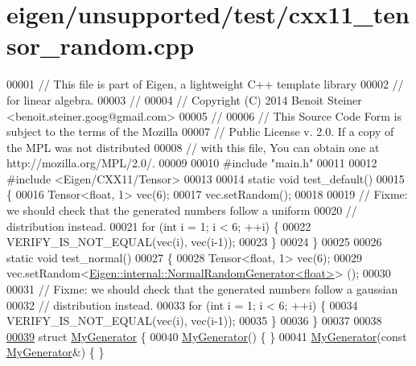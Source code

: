 \hypertarget{eigen_2unsupported_2test_2cxx11__tensor__random_8cpp_source}{}\section{eigen/unsupported/test/cxx11\+\_\+tensor\+\_\+random.cpp}
\label{eigen_2unsupported_2test_2cxx11__tensor__random_8cpp_source}

\begin{DoxyCode}
00001 \textcolor{comment}{// This file is part of Eigen, a lightweight C++ template library}
00002 \textcolor{comment}{// for linear algebra.}
00003 \textcolor{comment}{//}
00004 \textcolor{comment}{// Copyright (C) 2014 Benoit Steiner <benoit.steiner.goog@gmail.com>}
00005 \textcolor{comment}{//}
00006 \textcolor{comment}{// This Source Code Form is subject to the terms of the Mozilla}
00007 \textcolor{comment}{// Public License v. 2.0. If a copy of the MPL was not distributed}
00008 \textcolor{comment}{// with this file, You can obtain one at http://mozilla.org/MPL/2.0/.}
00009 
00010 \textcolor{preprocessor}{#include "main.h"}
00011 
00012 \textcolor{preprocessor}{#include <Eigen/CXX11/Tensor>}
00013 
00014 \textcolor{keyword}{static} \textcolor{keywordtype}{void} test\_default()
00015 \{
00016   Tensor<float, 1> vec(6);
00017   vec.setRandom();
00018 
00019   \textcolor{comment}{// Fixme: we should check that the generated numbers follow a uniform}
00020   \textcolor{comment}{// distribution instead.}
00021   \textcolor{keywordflow}{for} (\textcolor{keywordtype}{int} i = 1; i < 6; ++i) \{
00022     VERIFY\_IS\_NOT\_EQUAL(vec(i), vec(i-1));
00023   \}
00024 \}
00025 
00026 \textcolor{keyword}{static} \textcolor{keywordtype}{void} test\_normal()
00027 \{
00028   Tensor<float, 1> vec(6);
00029   vec.setRandom<\hyperlink{class_eigen_1_1internal_1_1_normal_random_generator}{Eigen::internal::NormalRandomGenerator<float>}>
      ();
00030 
00031   \textcolor{comment}{// Fixme: we should check that the generated numbers follow a gaussian}
00032   \textcolor{comment}{// distribution instead.}
00033   \textcolor{keywordflow}{for} (\textcolor{keywordtype}{int} i = 1; i < 6; ++i) \{
00034     VERIFY\_IS\_NOT\_EQUAL(vec(i), vec(i-1));
00035   \}
00036 \}
00037 
00038 
\hyperlink{struct_my_generator}{00039} \textcolor{keyword}{struct }\hyperlink{struct_my_generator}{MyGenerator} \{
00040   \hyperlink{struct_my_generator}{MyGenerator}() \{ \}
00041   \hyperlink{struct_my_generator}{MyGenerator}(\textcolor{keyword}{const} \hyperlink{struct_my_generator}{MyGenerator}&) \{ \}

\end{DoxyCode}
